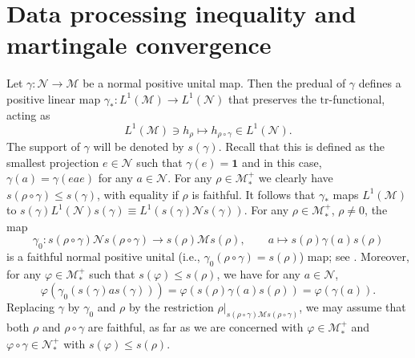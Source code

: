 \documentclass[12pt]{article}
\theoremstyle{definition}
\theoremstyle{remark}
\numberwithin{equation}{section}
\def\Me{\mathcal M}
\def\Ne{\mathcal N}
\def\Tr{\mathrm{tr}}
\def\ffi{\varphi}
\def\1{\mathbf{1}}
\begin{document}
\section{Data processing inequality and martingale convergence}

Let  $\gamma: \Ne\to \Me$ be a normal positive unital map. Then the  predual of $\gamma$  defines a 
positive linear map $\gamma_*: L^1(\Me)\to L^1(\Ne)$ that preserves the $\Tr$-functional,
acting as
\[
L^1(\Me)\ni h_\rho\mapsto h_{\rho\circ\gamma} \in L^1(\Ne).
\]
The support
of $\gamma$ will be {\color{red}denoted by $s(\gamma)$. Recall} that this is defined as the smallest projection
$e\in \Ne$ such that $\gamma(e)=\1$ and in this case, $\gamma(a)=\gamma(eae)$ for any $a\in
\Ne$. For any $\rho\in \Me_*^+$ we clearly have
$s(\rho\circ\gamma)\le s(\gamma)$, with equality if $\rho$ is faithful. 
It follows that $\gamma_*$ maps $L^1(\Me)$ to $s(\gamma)L^1(\Ne)s(\gamma)\equiv
L^1(s(\gamma)\Ne s(\gamma))$.  For any $\rho\in \Me_*^+$, $\rho\ne 0$, the map
\[
\gamma_0: {s(\rho\circ\gamma)\Ne s(\rho\circ\gamma)}\to s(\rho)\Me s(\rho),
\qquad a\mapsto s(\rho) \gamma(a)s(\rho)
\]
is a faithful normal positive unital {(i.e., $\gamma_0(\rho\circ\gamma)=s(\rho)$)} map;
{see \cite[Remark 6.7]{hiai2021lectures}.} Moreover, for any $\ffi\in \Me_*^+$ such that
$s(\ffi)\le s(\rho)$, we have for any $a\in \Ne$,
\[
\ffi(\gamma_0(s(\gamma)as(\gamma)))=\ffi(s(\rho)\gamma(a)s(\rho))={\ffi(\gamma(a)).}
\]
Replacing $\gamma$ by $\gamma_0$ and $\rho$ by the restriction
$\rho|_{s(\rho\circ\gamma)\Me s(\rho\circ\gamma)}$, we may  assume that both $\rho$
and $\rho\circ\gamma$ are faithful, as far as we are concerned with $\ffi\in\Me_*^+$ and
$\ffi\circ\gamma\in\Ne_*^+$ with $s(\ffi)\le s(\rho)$.
\end{document}
